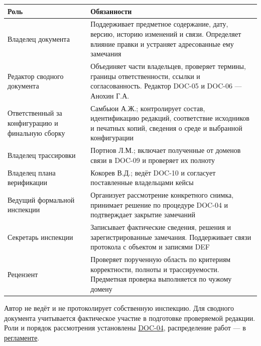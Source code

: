\documentclass[12pt,a4paper]{article}
\newcounter{none} %
\begin{document}
{\def\LTcaptype{none} %
\begin{longtable}[]{@{}
  >{\raggedright\arraybackslash}p{}
  >{\raggedright\arraybackslash}p{}@{}}
\toprule\noalign{}
\begin{minipage}[b]{\linewidth}\raggedright
Роль
\end{minipage} & \begin{minipage}[b]{\linewidth}\raggedright
Обязанности
\end{minipage} \\
\midrule\noalign{}
\endhead
\bottomrule\noalign{}
\endlastfoot
Владелец документа & Поддерживает предметное содержание, дату, версию, историю изменений и связи. Определяет влияние правки и устраняет адресованные ему замечания \\
Редактор сводного документа & Объединяет части владельцев, проверяет термины, границы ответственности, ссылки и согласованность. Редактор DOC-05 и DOC-06 --- Анохин Г.А. \\
Ответственный за конфигурацию и финальную сборку & Самбьюи А.Ж.; контролирует состав, идентификацию редакций, соответствие исходников и печатных копий, сведения о среде и выбранной конфигурации \\
Владелец трассировки & Портнов Л.М.; включает полученные от доменов связи в DOC-09 и проверяет их полноту \\
Владелец плана верификации & Кокорев В.Д.; ведёт DOC-10 и согласует поставленные владельцами кейсы \\
Ведущий формальной инспекции & Организует рассмотрение конкретного снимка, принимает решение по процедуре DOC-04 и подтверждает закрытие замечаний \\
Секретарь инспекции & Записывает фактические сведения, решения и зарегистрированные замечания. Поддерживает связи протокола с объектом и записями DEF \\
Рецензент & Проверяет порученную область по критериям корректности, полноты и трассируемости. Предметная проверка выполняется по чужому домену \\
\end{longtable}
}

Автор не ведёт и не протоколирует собственную инспекцию. Для сводного документа учитывается фактическое участие в подготовке проверяемой редакции. Роли и порядок рассмотрения установлены {\href{../06\_Процедура\_формальной\_инспекции/Процедура\_формальной\_инспекции.pdf}{DOC-04}}, распределение работ --- в \href{https://github.com/Kokorev-VD/mephi-samolety/blob/main/base/\%D0\%9F\%D1\%80\%D0\%BE\%D1\%86\%D0\%B5\%D1\%81\%D1\%81\%D1\%8B_\%D0\%B8_\%D0\%BE\%D0\%B1\%D1\%8F\%D0\%B7\%D0\%B0\%D0\%BD\%D0\%BD\%D0\%BE\%D1\%81\%D1\%82\%D0\%B8.md}{регламенте}.
\end{document}
